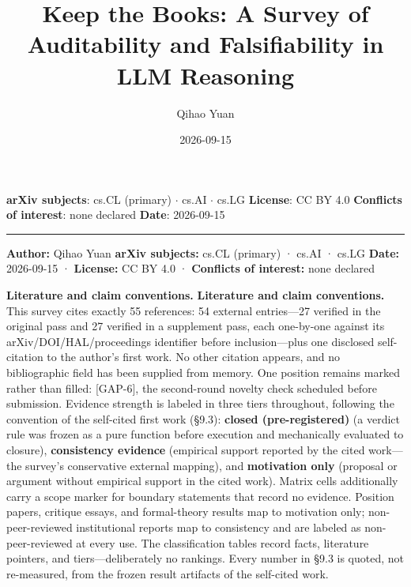 \documentclass[11pt,a4paper]{article}
\title{Keep the Books: A Survey of Auditability and Falsifiability in LLM Reasoning}
\author{Qihao Yuan}
\date{2026-09-15}
\begin{document}
\maketitle
\thispagestyle{empty}
\vspace{0.5em}
\noindent\textbf{arXiv subjects}: cs.CL (primary) $\cdot$ cs.AI $\cdot$ cs.LG \quad \textbf{License}: CC BY 4.0 \quad \textbf{Conflicts of interest}: none declared \quad \textbf{Date}: 2026-09-15
\vspace{0.5em}
\hrule
\vspace{0.8em}

\textbf{Author:} Qihao Yuan \textbf{arXiv subjects:} cs.CL (primary) · cs.AI · cs.LG \textbf{Date:} 2026-09-15 · \textbf{License:} CC BY 4.0 · \textbf{Conflicts of interest:} none declared

\noindent\textbf{Literature and claim conventions.} \textbf{Literature and claim conventions.} This survey cites exactly 55 references: 54 external entries—27 verified in the original pass and 27 verified in a supplement pass, each one-by-one against its arXiv/DOI/HAL/proceedings identifier before inclusion—plus one disclosed self-citation to the author's first work. No other citation appears, and no bibliographic field has been supplied from memory. One position remains marked rather than filled: [GAP-6], the second-round novelty check scheduled before submission. Evidence strength is labeled in three tiers throughout, following the convention of the self-cited first work (§9.3): \textbf{closed (pre-registered)} (a verdict rule was frozen as a pure function before execution and mechanically evaluated to closure), \textbf{consistency evidence} (empirical support reported by the cited work—the survey's conservative external mapping), and \textbf{motivation only} (proposal or argument without empirical support in the cited work). Matrix cells additionally carry a scope marker for boundary statements that record no evidence. Position papers, critique essays, and formal-theory results map to motivation only; non-peer-reviewed institutional reports map to consistency and are labeled as non-peer-reviewed at every use. The classification tables record facts, literature pointers, and tiers—deliberately no rankings. Every number in §9.3 is quoted, not re-measured, from the frozen result artifacts of the self-cited work.
\end{document}
